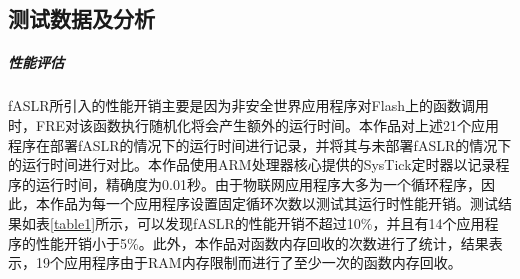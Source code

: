 \documentclass[12pt,a4paper]{ctexart}
\numberwithin{figure}{section}
\begin{document}
\subsection{测试数据及分析}

\subparagraph{性能评估}
\par fASLR所引入的性能开销主要是因为非安全世界应用程序对Flash上的函数调用时，FRE对该函数执行随机化将会产生额外的运行时间。本作品对上述21个应用程序在部署fASLR的情况下的运行时间进行记录，并将其与未部署fASLR的情况下的运行时间进行对比。本作品使用ARM处理器核心提供的SysTick定时器以记录程序的运行时间，精确度为0.01秒。由于物联网应用程序大多为一个循环程序，因此，本作品为每一个应用程序设置固定循环次数以测试其运行时性能开销。测试结果如表\ref{table1}所示，可以发现fASLR的性能开销不超过10\%，并且有14个应用程序的性能开销小于5\%。此外，本作品对函数内存回收的次数进行了统计，结果表示，19个应用程序由于RAM内存限制而进行了至少一次的函数内存回收。
\end{document}
